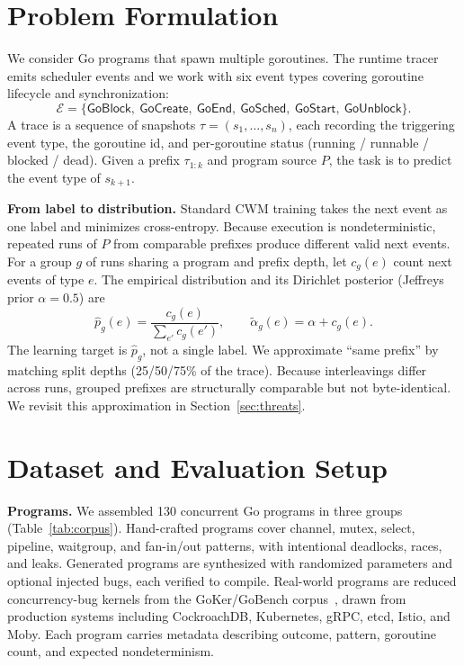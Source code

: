 \documentclass{svproc}
\newcommand{\pblock}{\textsf{GoBlock}}
\newcommand{\punblock}{\textsf{GoUnblock}}
\newcommand{\pstart}{\textsf{GoStart}}
\newcommand{\pcreate}{\textsf{GoCreate}}
\newcommand{\pend}{\textsf{GoEnd}}
\newcommand{\psched}{\textsf{GoSched}}
\begin{document}
\section{Problem Formulation}\label{sec:problem}

We consider Go programs that spawn multiple goroutines. The runtime
tracer emits scheduler events and we work with six event types covering
goroutine lifecycle and synchronization:
\[
\mathcal{E}=\{\pblock,\ \pcreate,\ \pend,\ \psched,\ \pstart,\ \punblock\}.
\]
A trace is a sequence of snapshots $\tau=(s_1,\dots,s_n)$, each
recording the triggering event type, the goroutine id, and per-goroutine
status (running / runnable / blocked / dead). Given a prefix $\tau_{1:k}$
and program source $P$, the task is to predict the event type of $s_{k+1}$.

\textbf{From label to distribution.}
Standard CWM training takes the next event as one label and minimizes
cross-entropy. Because execution is nondeterministic, repeated runs of
$P$ from comparable prefixes produce different valid next events. For a
group $g$ of runs sharing a program and prefix depth, let $c_g(e)$ count
next events of type $e$. The empirical distribution and its Dirichlet
posterior (Jeffreys prior $\alpha{=}0.5$) are
\begin{equation}
\hat{p}_g(e)=\frac{c_g(e)}{\sum_{e'}c_g(e')},\qquad
\tilde{\alpha}_g(e)=\alpha + c_g(e).
\end{equation}
The learning target is $\hat p_g$, not a single label. We approximate
``same prefix'' by matching split depths (25/50/75\% of the trace). Because
interleavings differ across runs, grouped prefixes are structurally
comparable but not byte-identical. We revisit this approximation in
Section~\ref{sec:threats}.

\section{Dataset and Evaluation Setup}\label{sec:data}

\textbf{Programs.}
We assembled 130 concurrent Go programs in three groups
(Table~\ref{tab:corpus}). Hand-crafted programs cover channel, mutex,
select, pipeline, waitgroup, and fan-in/out patterns, with intentional
deadlocks, races, and leaks. Generated programs are synthesized with
randomized parameters and optional injected bugs, each verified to
compile. Real-world programs are reduced concurrency-bug kernels from
the GoKer/GoBench corpus~\cite{goker}, drawn from production systems
including CockroachDB, Kubernetes, gRPC, etcd, Istio, and Moby. Each
program carries metadata describing outcome, pattern, goroutine count,
and expected nondeterminism.
\end{document}
